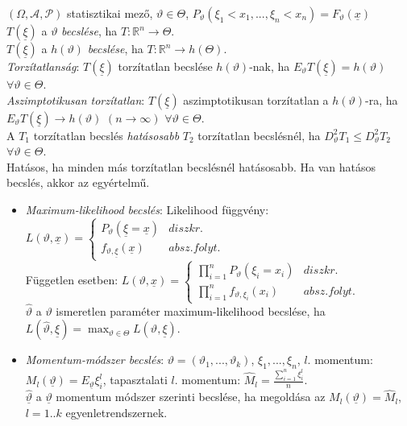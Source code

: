\documentclass[margin=0px]{article}
\begin{document}
	$(\Omega, \mathcal{A}, \mathcal{P})$ statisztikai mező, $\vartheta \in \Theta$, $P_{\vartheta}(\xi_1<x_1,...,\xi_n<x_n) = F_{\vartheta}(\underline{x})$ \\
	$T(\underline{\xi})$ a $\vartheta$ \textit{becslése}, ha $T: \mathbb{R}^n \to \Theta$. \\
	$T(\underline{\xi})$ a $h(\vartheta)$ \textit{becslése}, ha $T: \mathbb{R}^n \to h(\Theta)$. \\
	\textit{Torzítatlanság}: $T(\underline{\xi})$ torzítatlan becslése $h(\vartheta)$-nak, ha $E_{\vartheta}T(\underline{\xi}) = h(\vartheta)$ $\forall \vartheta \in \Theta$. \\
	\textit{Aszimptotikusan torzítatlan}: $T(\underline{\xi})$ aszimptotikusan torzítatlan a $h(\vartheta)$-ra, ha $E_{\vartheta}T(\underline{\xi}) \to h(\vartheta)$ $(n \to \infty)$ $\forall \vartheta \in \Theta$. \\
	A $T_1$ torzítatlan becslés \textit{hatásosabb} $T_2$ torzítatlan becslésnél, ha $D_{\vartheta}^{2}T_1 \leq D_{\vartheta}^{2}T_2$ $\forall \vartheta \in \Theta$. \\
	Hatásos, ha minden más torzítatlan becslésnél hatásosabb. Ha van hatásos becslés, akkor az egyértelmű.
	
	\begin{itemize}
		\item \textit{Maximum-likelihood becslés}: Likelihood függvény: $L(\vartheta, \underline{x}) = \left\{\begin{array} {lr}
		P_{\vartheta}(\underline{\xi} = \underline{x}) & diszkr. \\
		f_{\vartheta, \underline{\xi}}(\underline{x}) & absz. folyt.
		\end{array}\right.$ \\
		Független esetben: $L(\vartheta, \underline{x}) = \left\{\begin{array} {lr}
		\prod_{i=1}^{n}{P_{\vartheta}(\xi_i = x_i)} & diszkr. \\
		\prod_{i=1}^{n}{f_{\vartheta, \xi_i}(x_i)} & absz. folyt.
		\end{array}\right.$\\
		$\hat{\vartheta}$ a $\vartheta$ ismeretlen paraméter maximum-likelihood becslése, ha $L(\hat{\vartheta},\underline{\xi}) = \max_{\vartheta \in \Theta}{L(\vartheta,\underline{\xi})}$.
		\item \textit{Momentum-módszer becslés}: $\vartheta = (\vartheta_1, ..., \vartheta_k)$, $\xi_1, ..., \xi_n$, $l.$ momentum: $M_l(\underline{\vartheta}) = E_{\underline{\vartheta}}\xi_{i}^{l}$, tapasztalati $l.$ momentum: $\hat{M}_l = \frac{\sum_{i=1}^{n}{\xi_i^l}}{n}$. \\ $\hat{\underline{\vartheta}}$ a $\underline{\vartheta}$ momentum módszer szerinti becslése, ha megoldása az $M_l(\underline{\vartheta}) = \hat{M}_l$, $l=1..k$ egyenletrendszernek.
	\end{itemize}
	
\end{document}
